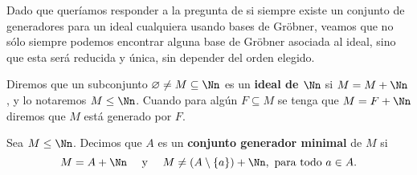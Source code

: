 Dado que queríamos responder a la pregunta de si siempre existe un conjunto de generadores para un ideal cualquiera usando bases de Gröbner, veamos que no sólo siempre podemos encontrar alguna base de Gröbner asociada al ideal, sino que esta será reducida y única, sin depender del orden elegido.
\begin{definicion}
    Diremos que un subconjunto $\varnothing \neq M \subseteq \Nn$ es un \textbf{ideal de $\boldsymbol{\Nn}$} si $M=M+\Nn$, y lo notaremos $M\le \Nn$. Cuando para algún $F\subseteq M$ se tenga que $M=F+\Nn$ diremos que $M$ está generado por $F$.
\end{definicion}
\begin{definicion}
    Sea $M\le \Nn$. Decimos que $A$ es un \textbf{conjunto generador minimal} de $M$ si
    \begin{equation*}
        M = A + \Nn \quad \text{ y } \quad M\neq (A\setminus \{a\}) + \Nn,\ \text{para todo } a \in A.
    \end{equation*}
\end{definicion}

